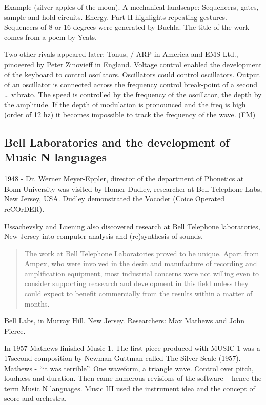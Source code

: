 Example (silver apples of the moon). A mechanical landscape: Sequencers, gates, sample and hold circuits. Energy. Part II highlights repeating gestures. Sequencers of 8 or 16 degrees were generated by Buchla. The title of the work comes from a poem by Yeats.

Two other rivals appeared later: Tonus, / ARP in America and EMS Ltd., pinoeered by Peter Zinovieff in England. Voltage control enabled the development of the keyboard to control oscilators. Oscillators could control oscillators. Output of an oscillator is connected across the frequency control break-point of a second … vibrato. The speed is controlled by the frequency of the oscillator, the depth by the amplitude. If the depth of modulation is pronounced and the freq is high (order of 12 hz) it becomes impossible to track the frequency of the wave. (FM)



\subsection{Bell Laboratories and the development of Music N languages}

1948 - Dr. Werner Meyer-Eppler, director of the department of Phonetics at Bonn University was visited by Homer Dudley, researcher at Bell Telephone Labs, New Jersey, USA. Dudley demonstrated the Vocoder (Coice Operated reCOrDER).

Ussachevsky and Luening also discovered research at Bell Telephone laboratories, New Jersey into computer analysis and (re)synthesis of sounds.

\begin{quotation}
The work at Bell Telephone Laboratories proved to be unique. Apart from Ampex, who were involved in the desin and manufacture of recording and amplification equipment, most industrial concerns were not willing even to consider supporting reasearch and development in this field unless they could expect to benefit commercially from the results within a matter of months. \citep[94]{manning2013electronic}
\end{quotation}


Bell Labs, in Murray Hill, New Jersey. Researchers: Max Mathews and John Pierce.

In 1957 Mathews finished Music 1. The first piece produced with MUSIC 1 was a 17second composition by Newman Guttman called The Silver Scale (1957). Mathews - ``it was terrible''. One waveform, a triangle wave. Control over pitch, loudness and duration. Then came numerous revisions of the software – hence the term Music N languages. Music III used the instrument idea and the concept of score and orchestra.

